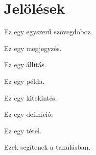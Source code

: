 \chapter{Jelölések}

\begin{blueBox}
  Ez egy egyszerű szövegdoboz.
\end{blueBox}

\begin{note}
  Ez egy megjegyzés.
\end{note}

\begin{statement}
  Ez egy állítás.
\end{statement}

\begin{example}
  Ez egy példa.
\end{example}

\begin{learnMore}
  Ez egy kitekintés.
\end{learnMore}

\begin{definition}
  Ez egy definíció.
\end{definition}

\begin{theorem}
  Ez egy tétel.
\end{theorem}

\begin{mdframed}[style=questions, frametitle={\color{white}Felkészülést segítő kérdések}]
  Ezek segítenek a tanulásban.
\end{mdframed}

